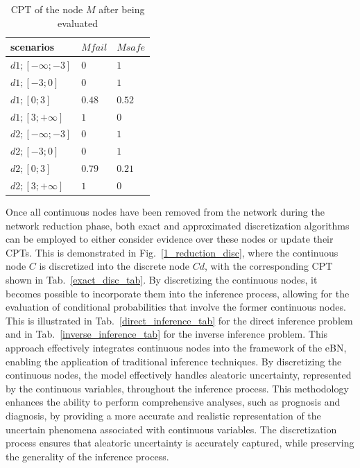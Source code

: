 \begin{table}[hbt!]
    \begin{center}
        \caption{CPT of the node $M$ after being evaluated}\label{Mnode_tab}
        \begin{tabular}{P{2cm}P{2cm}P{2cm}}
            \textbf{scenarios} & \textbf{$M fail$} & \textbf{$M safe$} \\
            \midrule
            $d1;[-\infty;-3]$ & $0$ & $1$ \\
            $d1;[-3;0]$ & $0$ & $1$ \\
            $d1;[0;3]$ & $ 0.48$ & $0.52$ \\
            $d1;[3;+\infty]$ & $ 1$ & $0$ \\
            $d2;[-\infty;-3]$ & $0$ & $1$ \\
            $d2;[-3;0]$ & $0$ & $1$ \\
            $d2;[0;3]$ & $0.79$ & $0.21$ \\
            $d2;[3;+\infty]$ & $1$ & $0$ \\
        \end{tabular}
    \end{center}
\end{table}
Once all continuous nodes have been removed from the network during the network reduction phase, both exact and approximated discretization algorithms can be employed to either consider evidence over these nodes or update their CPTs. This is demonstrated in Fig.~\ref{1_reduction_disc}, where the continuous node $C$ is discretized into the discrete node $Cd$, with the corresponding CPT shown in Tab.~\ref{exact_disc_tab}. By discretizing the continuous nodes, it becomes possible to incorporate them into the inference process, allowing for the evaluation of conditional probabilities that involve the former continuous nodes. This is illustrated in Tab.~\ref{direct_inference_tab} for the direct inference problem and in Tab.~\ref{inverse_inference_tab} for the inverse inference problem.
This approach effectively integrates continuous nodes into the framework of the eBN, enabling the application of traditional inference techniques. By discretizing the continuous nodes, the model effectively handles aleatoric uncertainty, represented by the continuous variables, throughout the inference process. This methodology enhances the ability to perform comprehensive analyses, such as prognosis and diagnosis, by providing a more accurate and realistic representation of the uncertain phenomena associated with continuous variables. 
The discretization process ensures that aleatoric uncertainty is accurately captured, while preserving the generality of the inference process. \\
